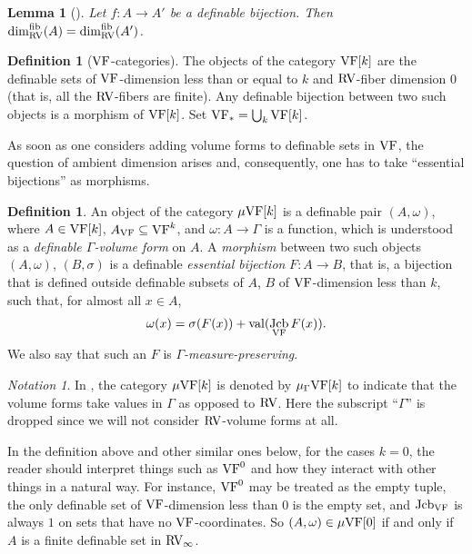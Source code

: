 \documentclass[12pt]{amsart}
\newcommand{\memph}[1]{{\color{magenta}\emph{#1}}}
\theoremstyle{plain}
\newtheorem{lem}[thm]{Lemma}
\theoremstyle{definition}
\newtheorem{defn}[thm]{Definition}
\theoremstyle{remark}
\newtheorem{nota}[thm]{Notation}
\numberwithin{equation}{section}
\theoremstyle{plain}
\newcommand{\VF}{\textup{VF}}
\newcommand{\RV}{\textup{RV}}
\DeclareMathOperator{\jcb}{Jcb}
\newcommand{\0}{\emptyset}
\newcommand{\fun}{\longrightarrow}
\newcommand{\sub}{\subseteq}
\newcommand{\mgVF}{{\mu} {\VF}}
\DeclareMathOperator{\vv}{val}
\DeclareMathOperator{\fib}{fib}
\begin{document}
\begin{lem}[{\cite[Lemma~4.13]{Yin:special:trans}}]\label{RV:fiber:dim:same}
Let $f : A \fun A'$ be a definable bijection. Then $\dim^{\fib}_{\RV}(A) = \dim^{\fib}_{\RV} (A')$.
\end{lem}

\begin{defn}[$\VF$-categories]\label{defn:VF:cat}
The objects of the category $\VF[k]$ are the definable sets of $\VF$-dimension less than or equal to $k$ and $\RV$-fiber dimension $0$ (that is, all the $\RV$-fibers are finite). Any definable bijection between two such objects is a morphism of $\VF[k]$. Set $\VF_* = \bigcup_k \VF[k]$.
\end{defn}

As soon as one considers adding volume forms to definable sets in $\VF$, the question of ambient dimension arises and, consequently, one has to take ``essential bijections'' as morphisms.

 \begin{defn}
\label{defn:VF:mu:G}
An object of the category $\mgVF[k]$ is a definable pair $(A, \omega)$, where $A \in \VF[k]$, $A_{\VF} \sub \VF^k$, and $\omega : A \fun \Gamma$ is a function, which is understood as a \memph{definable $\Gamma$-volume form} on $A$. A \memph{morphism} between two such objects $(A, \omega)$, $(B, \sigma)$ is a definable \memph{essential bijection} $F : A \fun B$, that is, a bijection that is defined outside definable subsets of $A$, $B$ of $\VF$-dimension less than $k$, such that, for almost all $x \in A$,
\begin{equation}\label{cond:mg}
\omega(x) = \sigma(F(x)) + \vv(\jcb_{\VF} F(x)).
\end{equation}
We also say that such an $F$ is \memph{$\Gamma$-measure-preserving}.
\end{defn}

\begin{nota}
In \cite{hrushovski:kazhdan:integration:vf}, the category $\mgVF[k]$ is denoted by ${\mu_{\Gamma}}{\VF[k]}$ to indicate that the volume forms take values in $\Gamma$ as opposed to $\RV$. Here the subscript ``$\Gamma$'' is dropped since  we will not consider $\RV$-volume forms at all.
\end{nota}

In the definition above and other similar ones below, for the cases $k =0$, the reader should interpret things such as $\VF^0$ and how they interact with other things in a natural way. For instance, $\VF^0$ may be treated as the empty tuple, the only definable set of $\VF$-dimension less than $0$ is the empty set, and $\jcb_{\VF}$ is always $1$ on sets that have no $\VF$-coordinates. So $(A, \omega) \in \mgVF[0]$ if and only if $A$ is a finite definable set in $\RV_\infty$.
\end{document}
